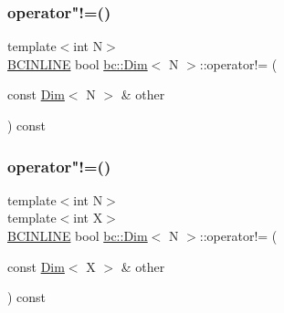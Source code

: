 \mbox{\label{structbc_1_1Dim_a2f7c00b2f4bf452d357e36e4bf93e68f}} 
\subsubsection{\texorpdfstring{operator"!=()}{operator!=()}\hspace{0.1cm}{\footnotesize\ttfamily [1/2]}}
{\footnotesize\ttfamily template$<$int N$>$ \\
\hyperlink{common_8h_a6699e8b0449da5c0fafb878e59c1d4b1}{B\+C\+I\+N\+L\+I\+NE} bool \hyperlink{structbc_1_1Dim}{bc\+::\+Dim}$<$ N $>$\+::operator!= (\begin{DoxyParamCaption}\item[{const \hyperlink{structbc_1_1Dim}{Dim}$<$ N $>$ \&}]{other }\end{DoxyParamCaption}) const\hspace{0.3cm}{\ttfamily [inline]}}

\mbox{\label{structbc_1_1Dim_a360349fe764e5681d79ec97bf7603107}} 
\subsubsection{\texorpdfstring{operator"!=()}{operator!=()}\hspace{0.1cm}{\footnotesize\ttfamily [2/2]}}
{\footnotesize\ttfamily template$<$int N$>$ \\
template$<$int X$>$ \\
\hyperlink{common_8h_a6699e8b0449da5c0fafb878e59c1d4b1}{B\+C\+I\+N\+L\+I\+NE} bool \hyperlink{structbc_1_1Dim}{bc\+::\+Dim}$<$ N $>$\+::operator!= (\begin{DoxyParamCaption}\item[{const \hyperlink{structbc_1_1Dim}{Dim}$<$ X $>$ \&}]{other }\end{DoxyParamCaption}) const\hspace{0.3cm}{\ttfamily [inline]}}

\mbox{\label{structbc_1_1Dim_adfeffe31c92089b7bc7447415b95fc10}} 
